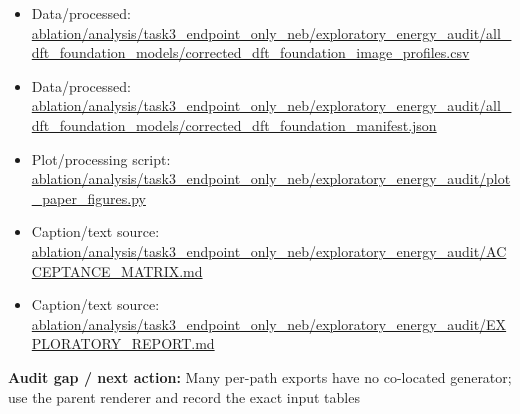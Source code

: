 \documentclass[10pt]{article}
\newcommand{\statusline}[1]{\colorbox{gray!12}{\parbox{0.96\linewidth}{#1}}}
\begin{document}
\begin{itemize}[leftmargin=1.4em,noitemsep]
\item Data/processed: \begingroup\scriptsize\url{ablation/analysis/task3_endpoint_only_neb/exploratory_energy_audit/all_dft_foundation_models/corrected_dft_foundation_image_profiles.csv}\endgroup
\item Data/processed: \begingroup\scriptsize\url{ablation/analysis/task3_endpoint_only_neb/exploratory_energy_audit/all_dft_foundation_models/corrected_dft_foundation_manifest.json}\endgroup
\item Plot/processing script: \begingroup\scriptsize\url{ablation/analysis/task3_endpoint_only_neb/exploratory_energy_audit/plot_paper_figures.py}\endgroup
\item Caption/text source: \begingroup\scriptsize\url{ablation/analysis/task3_endpoint_only_neb/exploratory_energy_audit/ACCEPTANCE_MATRIX.md}\endgroup
\item Caption/text source: \begingroup\scriptsize\url{ablation/analysis/task3_endpoint_only_neb/exploratory_energy_audit/EXPLORATORY_REPORT.md}\endgroup
\end{itemize}
\statusline{\textbf{Audit gap / next action:} Many per-path exports have no co-located generator; use the parent renderer and record the exact input tables}
\vfill
\clearpage
\end{document}
